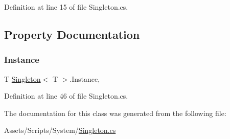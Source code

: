 Definition at line 15 of file Singleton.\+cs.



\subsection{Property Documentation}
\mbox{\label{class_singleton_a54103e8475b2a352ee759d5732307534}} 
\subsubsection{\texorpdfstring{Instance}{Instance}}
{\footnotesize\ttfamily T \mbox{\hyperlink{class_singleton}{Singleton}}$<$ T $>$.Instance\hspace{0.3cm}{\ttfamily [static]}, {\ttfamily [get]}}



Definition at line 46 of file Singleton.\+cs.



The documentation for this class was generated from the following file\+:\begin{DoxyCompactItemize}
\item 
Assets/\+Scripts/\+System/\mbox{\hyperlink{_singleton_8cs}{Singleton.\+cs}}\end{DoxyCompactItemize}

